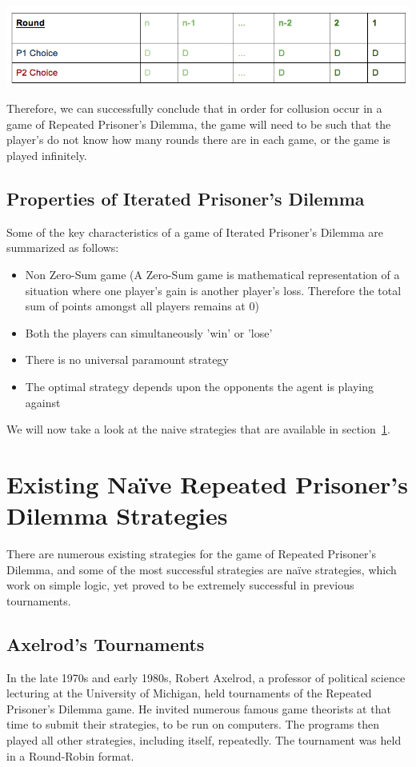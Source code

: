 \documentclass{icldt}
\numberwithin{equation}{section}       %
\begin{document}
\includegraphics[scale=.5]{RepeatedPayoff.png}

Therefore, we can successfully conclude that in order for collusion occur in a game of Repeated Prisoner's Dilemma, the game will need to be such that the player's do not know how many rounds there are in each game, or the game is played infinitely.

\subsection{Properties of Iterated Prisoner's Dilemma}
Some of the key characteristics of a game of Iterated Prisoner's Dilemma are summarized as follows:
\begin{itemize}
	\item Non Zero-Sum game (A Zero-Sum game is mathematical representation of a situation where one player's gain is another player's loss. Therefore the total sum of points amongst all players remains at 0)
\item Both the players can simultaneously 'win' or 'lose'
\item There is no universal paramount strategy
\item The optimal strategy depends upon the opponents the agent is playing against
\end{itemize}
We will now take a look at the naive strategies that are available in section~\ref{sect:Existing Naive Repeated Prisoner\'s Dilemma Strategies}.


\section{Existing Naïve Repeated Prisoner's Dilemma Strategies}
\label{sect:Existing Naive Repeated Prisoner\'s Dilemma Strategies}
There are numerous existing strategies for the game of Repeated Prisoner's Dilemma, and some of the most successful strategies are naïve strategies, which work on simple logic, yet proved to be extremely successful in previous tournaments. 

\subsection{Axelrod's Tournaments}
\label{sect:Axelrod\'s Tournaments}
In the late 1970s and early 1980s, Robert Axelrod, a professor of political science lecturing at the University of Michigan, held tournaments of the Repeated Prisoner's Dilemma game. He invited numerous famous game theorists at that time to submit their strategies, to be run on computers. The programs then played all other strategies, including itself, repeatedly. The tournament was held in a Round-Robin format.
\end{document}
